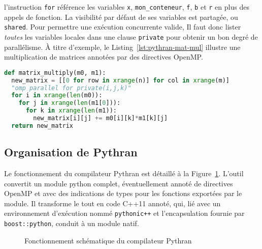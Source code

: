 \documentclass[renpar]{compas2013}
\begin{document}
\noindent l'instruction \texttt{for} référence les variables \texttt{x},
\texttt{mon\_conteneur}, \texttt{f}, \texttt{b} et \texttt{r} en plus des
appels de fonction. La visibilité par défaut de ses variables est
partagée, ou \texttt{shared}. Pour permettre une exécution concurrente
valide, Il faut donc lister \emph{toutes} les variables locales
dans une clause \texttt{private} pour obtenir un bon degré de
parallélisme.  À titre d'exemple, le Listing~\ref{lst:pythran-mat-mul}
illustre une multiplication de matrices annotées par des directives
OpenMP.

\begin{lstlisting}[language=python, label={lst:pythran-mat-mul},caption={multiplication de matrice avec
  annotations OpenMP}]
def matrix_multiply(m0, m1):
  new_matrix = [[0 for row in xrange(n)] for col in xrange(m)]
  "omp parallel for private(i,j,k)"
  for i in xrange(len(m0)):
    for j in xrange(len(m1[0])):
      for k in xrange(len(m1)):
        new_matrix[i][j] += m0[i][k]*m1[k][j]
  return new_matrix
\end{lstlisting}


\subsection{Organisation de Pythran}

Le fonctionnement du compilateur Pythran est détaillé à la
Figure~\ref{fig:pythran}. L'outil convertit un module python complet,
éventuellement annoté de directives OpenMP et avec des indications de
types pour les fonctions exportées par le module. Il transforme le tout en
code C++11 annoté, qui, lié avec un environnement d'exécution nommé
\texttt{pythonic++} et l'encapsulation fournie par \texttt{boost::python},
conduit à un module natif.

\begin{figure}
  \centering

  \caption{Fonctionnement schématique du compilateur Pythran}
  \label{fig:pythran}
\end{figure}
\end{document}
